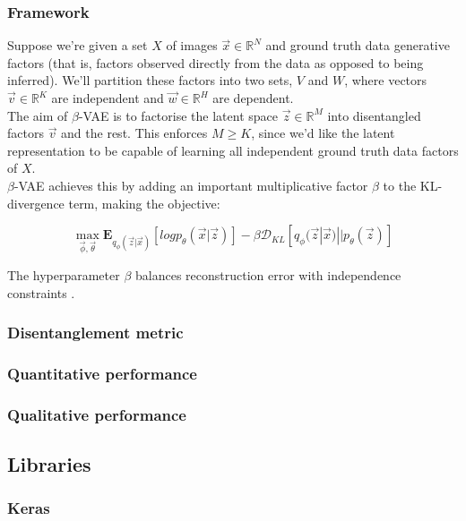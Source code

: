 \documentclass[12pt,twoside]{article}
\begin{document}
\subsubsection{Framework}

Suppose we're given a set $X$ of images $\vec{x}\in\mathbb{R}^N$ and ground truth data generative factors (that is, factors observed directly from the data as opposed to being inferred). We'll partition these factors into two sets, $V$ and $W$, where vectors $\vec{v}\in\mathbb{R}^K$ are independent and $\vec{w}\in\mathbb{R}^H$ are dependent.\\

The aim of $\beta$-VAE is to factorise the latent space $\vec{z}\in\mathbb{R}^M$ into disentangled factors $\vec{v}$ and the rest. This enforces $M\geq K$, since we'd like the latent representation to be capable of learning all independent ground truth data factors of $X$.\\

$\beta$-VAE achieves this by adding an important multiplicative factor $\beta$ to the KL-divergence term, making the objective:

\begin{equation}
\label{beta_vae_objective}
\max_{\vec{\phi},\vec{\theta}}\mathbf{E}_{q_{\phi}(\vec{z}|\vec{x})}[log p_{\theta}(\vec{x}|\vec{z})] - \beta\mathcal{D}_{KL}[q_{\phi}(\vec{z}|\vec{x})||p_{\theta}(\vec{z})]
\end{equation}

The hyperparameter $\beta$ balances reconstruction error with independence constraints \cite{Higgins2016}.

\subsubsection{Disentanglement metric}
\subsubsection{Quantitative performance}
\subsubsection{Qualitative performance}

\subsection{Libraries}
\subsubsection{Keras}
\end{document}
